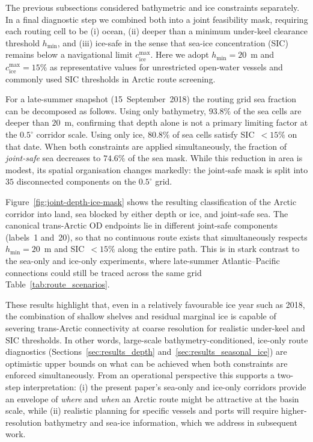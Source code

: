 The previous subsections considered bathymetric and ice constraints separately.
In a final diagnostic step we combined both into a joint feasibility mask,
requiring each routing cell to be (i) ocean, (ii) deeper than a minimum
under-keel clearance threshold $h_{\min}$, and (iii) ice-safe in the sense that
sea-ice concentration (SIC) remains below a navigational limit
$c_{\mathrm{ice}}^{\max}$.  Here we adopt $h_{\min}=20$~m and
$c_{\mathrm{ice}}^{\max}=15\%$ as representative values for unrestricted
open-water vessels and commonly used SIC thresholds in Arctic route screening.

For a late-summer snapshot (15~September~2018) the routing grid sea fraction
can be decomposed as follows.  Using only bathymetry, $93.8\%$ of the sea cells
are deeper than $20$~m, confirming that depth alone is not a primary limiting
factor at the $0.5^{\circ}$ corridor scale.  Using only ice, $80.8\%$ of sea
cells satisfy SIC~$<15\%$ on that date.  When both constraints are applied
simultaneously, the fraction of \emph{joint-safe} sea decreases to $74.6\%$ of
the sea mask.  While this reduction in area is modest, its spatial
organisation changes markedly: the joint-safe mask is split into
$35$ disconnected components on the $0.5^{\circ}$ grid.

Figure~\ref{fig:joint-depth-ice-mask} shows the resulting classification of the
Arctic corridor into land, sea blocked by either depth or ice, and joint-safe
sea.  The canonical trans-Arctic OD endpoints lie in different joint-safe
components (labels~1 and~20), so that no continuous route exists that
simultaneously respects $h_{\min}=20$~m and SIC~$<15\%$ along the entire path.
This is in stark contrast to the sea-only and ice-only experiments, where
late-summer Atlantic--Pacific connections could still be traced across the
same grid Table~\ref{tab:route_scenarios}. 

These results highlight that, even in a relatively favourable ice year such as
2018, the combination of shallow shelves and residual marginal ice is capable
of severing trans-Arctic connectivity at coarse resolution for realistic
under-keel and SIC thresholds.  In other words, large-scale
bathymetry-conditioned, ice-only route diagnostics (Sections~\ref{sec:results_depth}
and~\ref{sec:results_seasonal_ice}) are optimistic upper bounds on what can be
achieved when both constraints are enforced simultaneously.  From an
operational perspective this supports a two-step interpretation: (i) the
present paper’s sea-only and ice-only corridors provide an envelope of
\emph{where} and \emph{when} an Arctic route might be attractive at the basin
scale, while (ii) realistic planning for specific vessels and ports will
require higher-resolution bathymetry and sea-ice information, which we
address in subsequent work.


